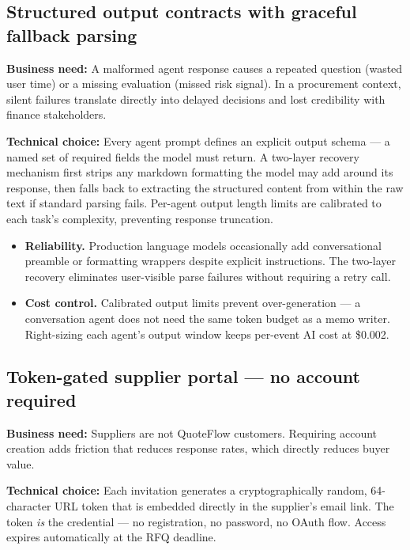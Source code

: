 \documentclass[11pt, a4paper]{article}
\begin{document}
\subsection{Structured output contracts with graceful fallback parsing}

\textbf{Business need:} A malformed agent response causes a repeated question
(wasted user time) or a missing evaluation (missed risk signal). In a procurement
context, silent failures translate directly into delayed decisions and lost credibility
with finance stakeholders.

\textbf{Technical choice:} Every agent prompt defines an explicit output schema ---
a named set of required fields the model must return. A two-layer recovery mechanism
first strips any markdown formatting the model may add around its response, then
falls back to extracting the structured content from within the raw text if standard
parsing fails. Per-agent output length limits are calibrated to each task's
complexity, preventing response truncation.

\begin{itemize}
  \item \textbf{Reliability.} Production language models occasionally add conversational
    preamble or formatting wrappers despite explicit instructions. The two-layer
    recovery eliminates user-visible parse failures without requiring a retry call.
  \item \textbf{Cost control.} Calibrated output limits prevent over-generation ---
    a conversation agent does not need the same token budget as a memo writer.
    Right-sizing each agent's output window keeps per-event AI cost at \$0.002.
\end{itemize}

\subsection{Token-gated supplier portal --- no account required}

\textbf{Business need:} Suppliers are not QuoteFlow customers. Requiring account
creation adds friction that reduces response rates, which directly reduces buyer
value.

\textbf{Technical choice:} Each invitation generates a cryptographically random,
64-character URL token that is embedded directly in the supplier's email link.
The token \textit{is} the credential --- no registration, no password, no OAuth
flow. Access expires automatically at the RFQ deadline.
\end{document}
